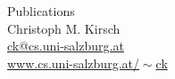 \documentclass[a4paper]{article}
\begin{document}


\begin{center}
{\sc \Large Publications} \\[5mm]
{\sc \large Christoph M. Kirsch} \\[2mm]
\href{mailto:ck@cs.uni-salzburg.at}{ck@cs.uni-salzburg.at} \\
\href{http://www.cs.uni-salzburg.at/~ck}{www.cs.uni-salzburg.at/$\!\sim$ck}
\end{center}


\end{document}
